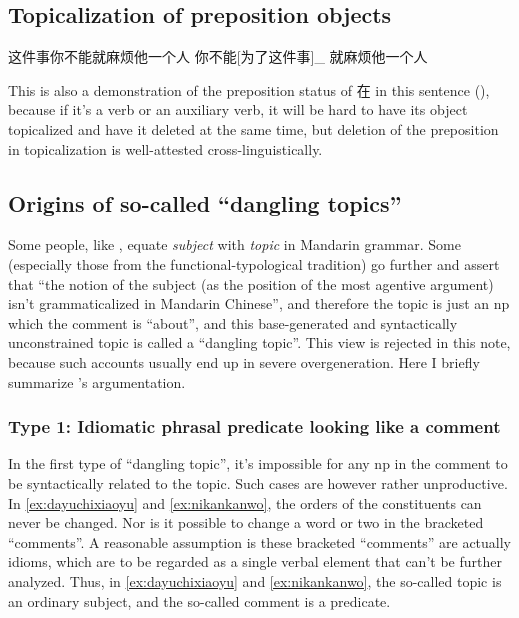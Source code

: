 \documentclass[UTF8, a4paper, oneside, scheme=plain, 12pt]{ctexrep}
\newcommand*{\citesec}[1]{\S~{#1}}
\newcommand*{\term}[1]{\emph{#1}}
\begin{document}
\subsection{Topicalization of preposition objects}\label{sec:topicalization-of-preposition-objects}

\begin{exe}
    \ex\label{ex:zhejianshinibunengjiumafantayigeren} 这件事你不能就麻烦他一个人
    \ex 你不能[为了这件事]_{} 就麻烦他一个人
\end{exe}
This is also a demonstration of the preposition status of 在 in this sentence (),
because if it's a verb or an auxiliary verb,
it will be hard to have its object topicalized and have it deleted at the same time,
but deletion of the preposition in topicalization is well-attested cross-linguistically.

\subsection{Origins of so-called ``dangling topics''}\label{sec:topic-subject}

Some people, like \citet[\citesec{7.1}]{zhudexigrammar},
equate \term{subject} with \term{topic} in Mandarin grammar.
Some (especially those from the functional-typological tradition) go further 
and assert that ``the notion of the subject (as the position of the most agentive argument) 
isn't grammaticalized in Mandarin Chinese'',
and therefore the topic is just an \acs{np} which the comment is ``about'',
and this base-generated and syntactically unconstrained topic 
is called a ``dangling topic''.
This view is rejected in this note,
because such accounts usually end up in severe overgeneration. 
Here I briefly summarize \citet{sih2000topic}'s argumentation.

\subsubsection{Type 1: Idiomatic phrasal predicate looking like a comment}\label{sec:clause.dangling-topic.1}

In the first type of ``dangling topic'',
it's impossible for any \acs{np} in the comment to be syntactically related to the topic.
Such cases are however rather unproductive. 
In \eqref{ex:dayuchixiaoyu} and \eqref{ex:nikankanwo},
the orders of the constituents can never be changed.
Nor is it possible to change a word or two in the bracketed ``comments''.
A reasonable assumption is these bracketed ``comments''
are actually idioms, 
which are to be regarded as a single verbal element that can't be further analyzed.
Thus, in \eqref{ex:dayuchixiaoyu} and \eqref{ex:nikankanwo},
the so-called topic is an ordinary subject,
and the so-called comment is a predicate.
\end{document}
